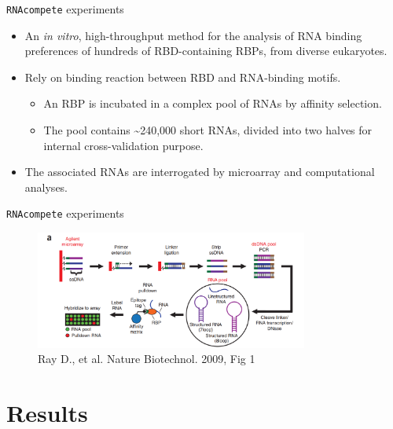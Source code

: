 \documentclass[professionalfont, 12pt, default]{beamer}
\providecommand{\tightlist}{%
    \setlength{\itemsep}{0pt}\setlength{\parskip}{0pt}}
\begin{document}
\begin{frame}{\texttt{RNAcompete} experiments}

\begin{itemize}
\tightlist
\item
  An \emph{in vitro}, high-throughput method for the analysis of RNA
  binding preferences of hundreds of RBD-containing RBPs, from diverse
  eukaryotes.
\item
  Rely on binding reaction between RBD and RNA-binding motifs.

  \begin{itemize}
  \tightlist
  \item
    An RBP is incubated in a complex pool of RNAs by affinity selection.
  \item
    The pool contains \textasciitilde{}240,000 short RNAs, divided into
    two halves for internal cross-validation purpose.
  \end{itemize}
\item
  The associated RNAs are interrogated by microarray and computational
  analyses.
\end{itemize}

\end{frame}

\begin{frame}{\texttt{RNAcompete} experiments}

\begin{figure}
\centering
\includegraphics[width=0.80000\textwidth]{img/RNAcompete.png}
\caption{Ray D., et al. Nature Biotechnol. 2009, Fig 1}
\end{figure}

\end{frame}

\section{Results}\label{results}
\end{document}
